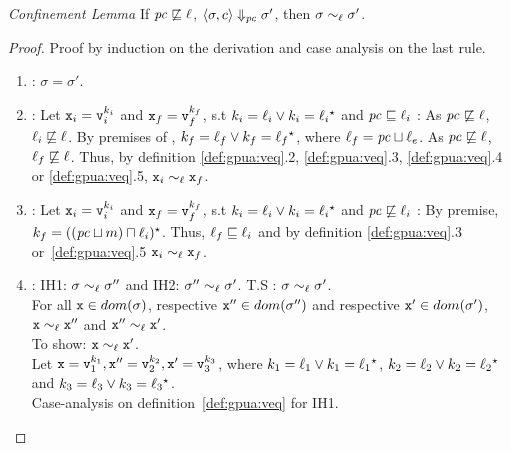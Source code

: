 \begin{myLemma}{\emph{Conf{i}nement Lemma}}
\label{lem:app:gpua:conf}
If $\mathit{pc} \not\sqsubseteq \ell$, $\langle \sigma, c \rangle \Downarrow_{\mathit{pc}}
\sigma'$, then $\sigma \sim_\ell \sigma'$.
\end{myLemma}
\begin{proof}
Proof by induction on the derivation and case analysis on the last rule.
\begin{enumerate}
\item {} : $\sigma = \sigma'$.

\item {}: Let $\texttt{x}_i = \texttt{v}_i^{k_i}$ and $\texttt{x}_f =
  \texttt{v}_f^{k_f}$, s.t $k_i = \ell_i \vee k_i =   \ell_i {}^\star
   $ and  $\mathit{pc} \sqsubseteq \ell_i$ : As $\mathit{pc} \not\sqsubseteq \ell$, $\ell_i
      \not\sqsubseteq \ell$. By premises of
      , $k_f = \ell_f \vee k_f =  \ell_f{}^\star  $,
      where $\ell_f = \mathit{pc} \sqcup \ell_e$. As $\mathit{pc} \not\sqsubseteq \ell$,
      $\ell_f \not\sqsubseteq \ell$. 
      Thus, by definition \ref{def:gpua:veq}.2, \ref{def:gpua:veq}.3, \ref{def:gpua:veq}.4 or
      \ref{def:gpua:veq}.5, $\texttt{x}_i \sim_\ell \texttt{x}_f$. 

\item {}: Let $\texttt{x}_i = \texttt{v}_i^{k_i}$ and $\texttt{x}_f =
  \texttt{v}_f^{k_f}$, s.t $k_i = \ell_i \vee k_i =   \ell_i {}^\star
   $ and $\mathit{pc} \not\sqsubseteq \ell_i$ :
  By premise, $k_f =   ((\mathit{pc} \sqcup m) \sqcap \ell_i) {}^\star  $. Thus,
  $\ell_f \sqsubseteq \ell_i$ and by definition
  \ref{def:gpua:veq}.3 or~\ref{def:gpua:veq}.5 $\texttt{x}_i \sim_\ell \texttt{x}_f$.

\item {} : IH1: $\sigma \sim_\ell \sigma''$ and IH2: $\sigma''
  \sim_\ell \sigma'$. 
 T.S : $\sigma \sim_\ell \sigma'$.\\
  For all $\texttt{x} \in dom(\sigma)$,
 respective $\texttt{x}''  \in dom(\sigma'')$ and
 respective $\texttt{x}' \in dom(\sigma')$, $\texttt{x} \sim_\ell \texttt{x}''$ and $\texttt{x}''
 \sim_\ell \texttt{x}'$. \\
 To show: $\texttt{x} \sim_\ell \texttt{x}'$. \\
 Let $\texttt{x} = \texttt{v}_1^{k_1}, \texttt{x}'' = \texttt{v}_2^{k_2}, \texttt{x}' = \texttt{v}_3^{k_3}$, where $k_1 =
 \ell_1 \vee k_1 =   \ell_1{}^\star  $, $k_2 =
 \ell_2 \vee k_2 =   \ell_2{}^\star  $ and $k_3 =
 \ell_3 \vee k_3 =   \ell_3{}^\star  $.\\
Case-analysis on definition~\ref{def:gpua:veq} for IH1.
 \begin{itemize}


\end{itemize}
\end{enumerate}
\end{proof}
